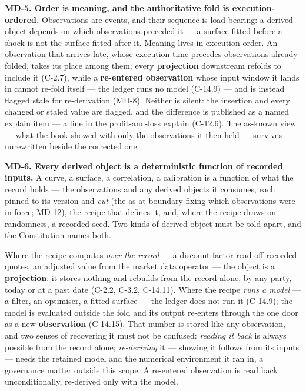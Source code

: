 \documentclass[11pt,a4paper]{article}
\newcommand{\mlabel}[1]{\leavevmode\hypertarget{md-#1}{}%
  \marginpar{\raggedright\scriptsize\ttfamily\textcolor{gray}{#1}}}
\newcommand{\trace}[1]{\par\smallskip{\small\itshape (#1)}}
\begin{document}
\mlabel{MD-5}\textbf{MD-5. Order is meaning, and the authoritative fold
is execution-ordered.} Observations are events, and their sequence is
load-bearing: a derived object depends on which observations preceded
it --- a surface fitted before a shock is not the surface fitted after
it. Meaning lives in execution order. An observation that arrives late,
whose execution time precedes observations already folded, takes its
place among them; every \textbf{projection} downstream refolds to include
it (C-2.7), while a \textbf{re-entered observation} whose input window it
lands in cannot re-fold itself --- the ledger runs no model (C-14.9) ---
and is instead flagged stale for re-derivation (MD-8). Neither is silent:
the insertion and every changed or staled value are flagged, and the
difference is published as a named explain item --- a line in the
profit-and-loss explain (C-12.6). The as-known view --- what the book
showed with only the observations it then held --- survives unrewritten
beside the corrected one.
\trace{Order, Time travel; C-2.7, C-12.6, C-14.9.}

\mlabel{MD-6}\textbf{MD-6. Every derived object is a deterministic
function of recorded inputs.} A curve, a surface, a correlation, a
calibration is a function of what the record holds --- the observations
and any derived objects it consumes, each pinned to its version and
\emph{cut} (the as-at boundary fixing which observations were in force;
MD-12), the recipe that defines it, and, where the recipe draws on
randomness, a recorded seed. Two kinds of
derived object must be told apart, and the Constitution names both.

Where the recipe computes \emph{over the record} --- a discount factor
read off recorded quotes, an adjusted value from the market data operator
--- the object is a \textbf{projection}: it stores nothing and rebuilds
from the record alone, by any party, today or at a past date (C-2.2,
C-3.2, C-14.11). Where the recipe \emph{runs a model} --- a filter, an
optimiser, a fitted surface --- the ledger does not run it (C-14.9); the
model is evaluated outside the fold and its output re-enters through the
one door as a new \textbf{observation} (C-14.15). That number is stored
like any observation, and two senses of recovering it must not be
confused: \emph{reading it back} is always possible from the record
alone; \emph{re-deriving} it --- showing it follows from its inputs ---
needs the retained model and the numerical environment it ran in, a
governance matter outside this scope. A re-entered observation is read
back unconditionally, re-derived only with the model.
\end{document}
